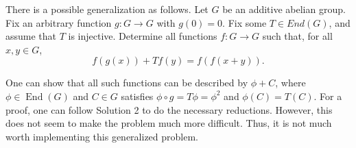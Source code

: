 \documentclass{article}
\DeclareMathOperator{\End}{End}
\begin{document}
There is a possible generalization as follows.
Let $G$ be an additive abelian group.
Fix an arbitrary function $g : G \to G$ with $g(0) = 0$.
Fix some $T \in End(G)$, and assume that $T$ is injective.
Determine all functions $f : G \to G$ such that, for all $x, y \in G$,
\[ f(g(x)) + Tf(y) = f(f(x + y)). \]

One can show that all such functions can be described by $\phi + C$, where $\phi \in \End(G)$ and $C \in G$ satisfies $\phi \circ g = T \phi = \phi^2$ and $\phi(C) = T(C)$.
For a proof, one can follow Solution 2 to do the necessary reductions.
However, this does not seem to make the problem much more difficult.
Thus, it is not much worth implementing this generalized problem.
\end{document}
